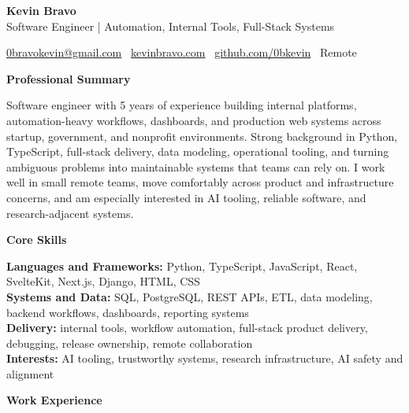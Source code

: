 \documentclass[11pt]{article}
\begin{document}
\begin{center}
    {\LARGE \textbf{Kevin Bravo}}\\
    Software Engineer | Automation, Internal Tools, Full-Stack Systems \\
    \hrulefill
\end{center}

\begin{center}
    \href{mailto:0bravokevin@gmail.com}{0bravokevin@gmail.com}
    \textbullet\
    \href{https://kevinbravo.com}{kevinbravo.com}
    \textbullet\
    \href{https://github.com/0bkevin}{github.com/0bkevin}
    \textbullet\
Remote
\end{center}

\vspace{4pt}
\begin{center}
    \textbf{Professional Summary}
\end{center}
\vspace{-4pt}
Software engineer with 5 years of experience building internal platforms, automation-heavy workflows, dashboards, and production web systems across startup, government, and nonprofit environments. Strong background in Python, TypeScript, full-stack delivery, data modeling, operational tooling, and turning ambiguous problems into maintainable systems that teams can rely on. I work well in small remote teams, move comfortably across product and infrastructure concerns, and am especially interested in AI tooling, reliable software, and research-adjacent systems.

\vspace{6pt}
\begin{center}
    \textbf{Core Skills}
\end{center}
\vspace{-4pt}
\textbf{Languages and Frameworks:} Python, TypeScript, JavaScript, React, SvelteKit, Next.js, Django, HTML, CSS \\
\textbf{Systems and Data:} SQL, PostgreSQL, REST APIs, ETL, data modeling, backend workflows, dashboards, reporting systems \\
\textbf{Delivery:} internal tools, workflow automation, full-stack product delivery, debugging, release ownership, remote collaboration \\
\textbf{Interests:} AI tooling, trustworthy systems, research infrastructure, AI safety and alignment

\vspace{6pt}
\begin{center}
    \textbf{Work Experience}
\end{center}
\vspace{-4pt}
\end{document}
